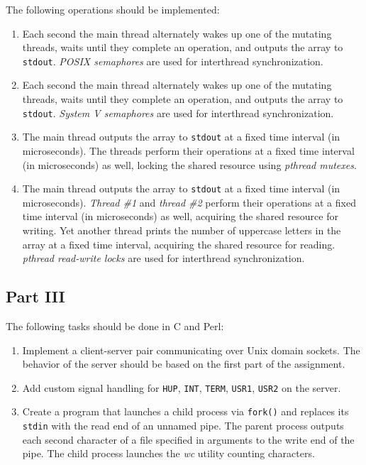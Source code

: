 \documentclass[en, listings]{labreport}
\begin{document}
The following operations should be implemented:
\begin{enumerate}
\item Each second the main thread alternately wakes up one of the mutating threads,
  waits until they complete an operation, and outputs the array to \verb|stdout|.
  \textit{POSIX semaphores} are used for interthread synchronization.
\item Each second the main thread alternately wakes up one of the mutating threads,
  waits until they complete an operation, and outputs the array to \verb|stdout|.
  \textit{System V semaphores} are used for interthread synchronization.
\item The main thread outputs the array to \verb|stdout| at a fixed time interval
  (in microseconds). The threads perform their operations at a fixed time interval
  (in microseconds) as well, locking the shared resource using
  \textit{pthread mutexes}.
\item The main thread outputs the array to \verb|stdout| at a fixed time interval
  (in microseconds). \textit{Thread \#1} and \textit{thread \#2} perform their
  operations at a fixed time interval (in microseconds) as well,
  acquiring the shared resource for writing. Yet another thread prints the
  number of uppercase letters in the array at a fixed time interval,
  acquiring the shared resource for reading. \textit{pthread read-write locks}
  are used for interthread synchronization.
\end{enumerate}

\subsection*{Part III}

The following tasks should be done in C and Perl:
\begin{enumerate}
\item Implement a client-server pair communicating over Unix domain sockets.
  The behavior of the server should be based on the first part of the assignment.
\item Add custom signal handling for \verb|HUP|, \verb|INT|, \verb|TERM|,
  \verb|USR1|, \verb|USR2| on the server.
\item Create a program that launches a child process via \verb|fork()| and
  replaces its \verb|stdin| with the read end of an unnamed pipe. The parent
  process outputs each second character of a file specified in arguments
  to the write end of the pipe. The child process launches the \textit{wc}
  utility counting characters.
\end{enumerate}
\end{document}

